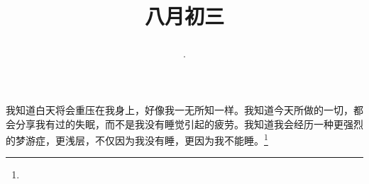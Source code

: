 \title{\date[d=5,m=9,y=2024][year:cn-y,年,month:cn,day:cn,日,·,weekday]·八月初三 }
我知道白天将会重压在我身上，好像我一无所知一样。我知道今天所做的一切，都会分享我有过的失眠，而不是我没有睡觉引起的疲劳。我知道我会经历一种更强烈的梦游症，更浅层，不仅因为我没有睡，更因为我不能睡。\footnote{ }

